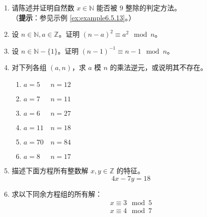 \begin{enumerate}[label=(\arabic*)]
    \item 请陈述并证明自然数 $x \in \mathbb{N}$ 能否被 $9$ 整除的判定方法。\\
    （\textbf{提示}：参见示例 \ref{ex:example6.5.13}。）
    \item 设 $n \in \mathbb{N}, a \in \mathbb{Z}$。证明 $ (n-a)^2 \equiv a^2 \mod n$。
    \item 设 $n \in \mathbb{N} - \{1\}$。证明 $ (n-1)^{-1} \equiv n - 1 \mod n$。
    \item 对下列各组 $(a, n)$，求 $a$ 模 $n$ 的乘法逆元，或说明其不存在。
    \begin{enumerate}[label=(\alph*)]
        \item $a = 5 \enspace\quad n = 12$
        \item $a = 7 \enspace\quad n = 11$
        \item $a = 6 \enspace\quad n = 27$
        \item $a = 11 \quad n = 18$
        \item $a = 70 \quad n = 84$
        \item $a = 8 \enspace \quad n = 17$
    \end{enumerate}
    \item 描述下面方程所有整数解 $x, y \in \mathbb{Z}$ 的特征。
        \[4x - 7y = 18\]
    \item 求以下同余方程组的所有解：
        \begin{align*}
            x \equiv 3 \mod 5 \\
            x \equiv 4 \mod 7
        \end{align*}
\end{enumerate}